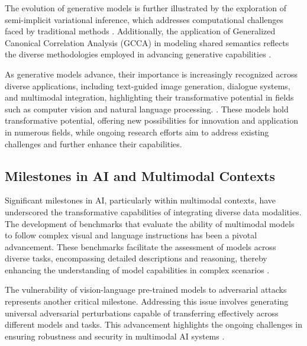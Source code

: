 The evolution of generative models is further illustrated by the exploration of semi-implicit variational inference, which addresses computational challenges faced by traditional methods \cite{moens2021efficientsemiimplicitvariationalinference}. Additionally, the application of Generalized Canonical Correlation Analysis (GCCA) in modeling shared semantics reflects the diverse methodologies employed in advancing generative capabilities \cite{raposo2019lowdimensionalembodiedsemanticsmusic}.



As generative models advance, their importance is increasingly recognized across diverse applications, including text-guided image generation, dialogue systems, and multimodal integration, highlighting their transformative potential in fields such as computer vision and natural language processing. \cite{palmini2024patternscreativityuserinput,ramesh2021zero}. These models hold transformative potential, offering new possibilities for innovation and application in numerous fields, while ongoing research efforts aim to address existing challenges and further enhance their capabilities.



\subsection{Milestones in AI and Multimodal Contexts} \label{subsec:Milestones in AI and Multimodal Contexts}



Significant milestones in AI, particularly within multimodal contexts, have underscored the transformative capabilities of integrating diverse data modalities. The development of benchmarks that evaluate the ability of multimodal models to follow complex visual and language instructions has been a pivotal advancement. These benchmarks facilitate the assessment of models across diverse tasks, encompassing detailed descriptions and reasoning, thereby enhancing the understanding of model capabilities in complex scenarios \cite{liu2024visual}.



The vulnerability of vision-language pre-trained models to adversarial attacks represents another critical milestone. Addressing this issue involves generating universal adversarial perturbations capable of transferring effectively across different models and tasks. This advancement highlights the ongoing challenges in ensuring robustness and security in multimodal AI systems \cite{zhang2024universaladversarialperturbationsvisionlanguage}.



